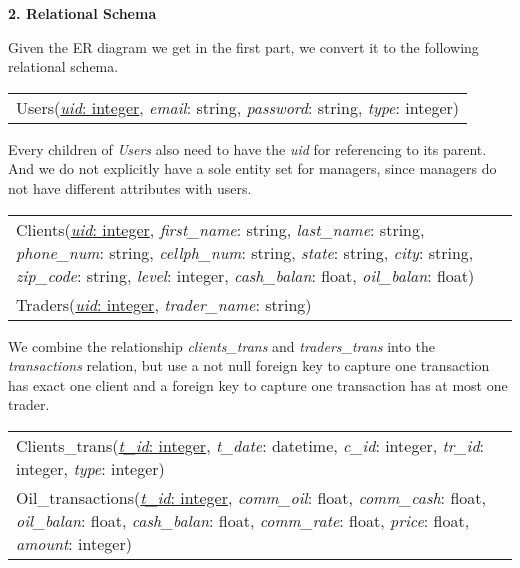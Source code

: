 \documentclass[12pt,a4paper]{report}
\begin{document}
\begin{mypara}
  \textbf{2. Relational Schema}
  \par
  Given the ER diagram we get in the first part, we convert it to the following relational schema.
  \par
  \begin{center}
    \begin{tabular}{R{\textwidth}}
      Users(\underline{\textit{uid}: integer}, \textit{email}: string, \textit{password}: string, \textit{type}: integer)
    \end{tabular}
\end{center}
  \par
  Every children of \textit{Users} also need to have the \textit{uid} for referencing to its parent. And we do not explicitly have a sole entity set for managers, since managers do not have different attributes with users.\par
  \begin{center}
    \begin{tabular}{R{\textwidth}}
      Clients(\underline{\textit{uid}: integer}, \textit{first\_name}: string, \textit{last\_name}: string, \textit{phone\_num}: string, \textit{cellph\_num}: string, \textit{state}: string, \textit{city}: string, \textit{zip\_code}: string, \textit{level}: integer, \textit{cash\_balan}: float, \textit{oil\_balan}: float)\\
      Traders(\underline{\textit{uid}: integer}, \textit{trader\_name}: string)
      \end{tabular}
  \end{center}
  \par
  We combine the relationship \textit{clients\_trans} and \textit{traders\_trans} into the \textit{transactions} relation, but use a not null foreign key to capture one transaction has exact one client and a foreign key to capture one transaction has at most one trader.
  \par
  \begin{center}
    \begin{tabular}{R{\textwidth}}
      Clients\_trans(\underline{\textit{t\_id}: integer}, \textit{t\_date}: datetime, \textit{c\_id}: integer, \textit{tr\_id}: integer, \textit{type}: integer)\\
      Oil\_transactions(\underline{\textit{t\_id}: integer}, \textit{comm\_oil}: float, \textit{comm\_cash}: float, \textit{oil\_balan}: float, \textit{cash\_balan}: float, \textit{comm\_rate}: float, \textit{price}: float, \textit{amount}: integer)\\

\end{tabular}
\end{center}
\end{mypara}
\end{document}
